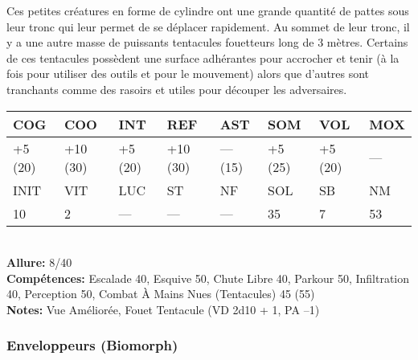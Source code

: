 Ces petites créatures en forme de cylindre ont une grande quantité de pattes sous leur tronc qui leur permet de se déplacer rapidement. Au sommet de leur tronc, il y a une autre masse de puissants tentacules fouetteurs long de 3 mètres. Certains de ces tentacules possèdent une surface adhérantes pour accrocher et tenir (à la fois pour utiliser des outils et pour le mouvement) alors que d'autres sont tranchants comme des rasoirs et utiles pour découper les adversaires. \\ \begin{tabular}{|l|l|l|l|l|l|l|l|} \hline

COG &COO &INT &REF &AST &SOM &VOL &MOX \\ \hline

+5 (20) &+10 (30) &+5 (20) &+10 (30) &— (15) &+5 (25) &+5 (20) &— \\ \hline

INIT &VIT &LUC &ST &NF &SOL &SB &NM \\ \hline

10 &2 &— &— &— &35 &7 &53 \\ \hline

\end{tabular} \\ \textbf{Allure:} 8/40 \\ \textbf{Compétences:} Escalade 40, Esquive 50, Chute Libre 40, Parkour 50, Infiltration 40, Perception 50, Combat À Mains Nues (Tentacules) 45 (55) \\ \textbf{Notes: }Vue Améliorée, Fouet Tentacule (VD 2d10 + 1, PA –1) 

\subsubsection{Enveloppeurs (Biomorph)} 

